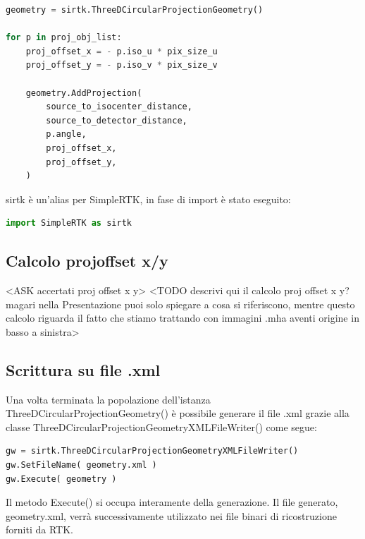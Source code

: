 \documentclass[a4paper,12pt, doubleside]{report}
\begin{document}
                    \begin{lstlisting}[language=python, frame=bt]
geometry = sirtk.ThreeDCircularProjectionGeometry()

for p in proj_obj_list:
    proj_offset_x = - p.iso_u * pix_size_u
    proj_offset_y = - p.iso_v * pix_size_v

    geometry.AddProjection(
        source_to_isocenter_distance,
        source_to_detector_distance,
        p.angle,
        proj_offset_x,
        proj_offset_y,
    )
                    \end{lstlisting}
                sirtk è un'alias per SimpleRTK, in fase di import è stato eseguito:
                \begin{lstlisting}[language=python, frame=bt]
import SimpleRTK as sirtk
                \end{lstlisting}
                
        
            \subsection{Calcolo proj\textunderscore offset \textunderscore x/y}
                <ASK accertati proj offset x y>
                <TODO descrivi qui il calcolo proj offset x y? magari nella Presentazione puoi solo spiegare a cosa si riferiscono, mentre questo calcolo riguarda il fatto che stiamo trattando con immagini .mha aventi origine in basso a sinistra>
                
            \subsection{Scrittura su file .xml}
                \par 
                    Una volta terminata la popolazione dell'istanza ThreeDCircularProjectionGeometry() è possibile generare il file .xml grazie alla classe ThreeDCircularProjectionGeometryXMLFileWriter() come segue:
                    \begin{lstlisting}[language=python, frame=bt]
gw = sirtk.ThreeDCircularProjectionGeometryXMLFileWriter()
gw.SetFileName( geometry.xml )
gw.Execute( geometry )
                    \end{lstlisting}
                    Il metodo Execute() si occupa interamente della generazione. Il file generato, geometry.xml, verrà successivamente utilizzato nei file binari di ricostruzione forniti da RTK.
        
\end{document}
